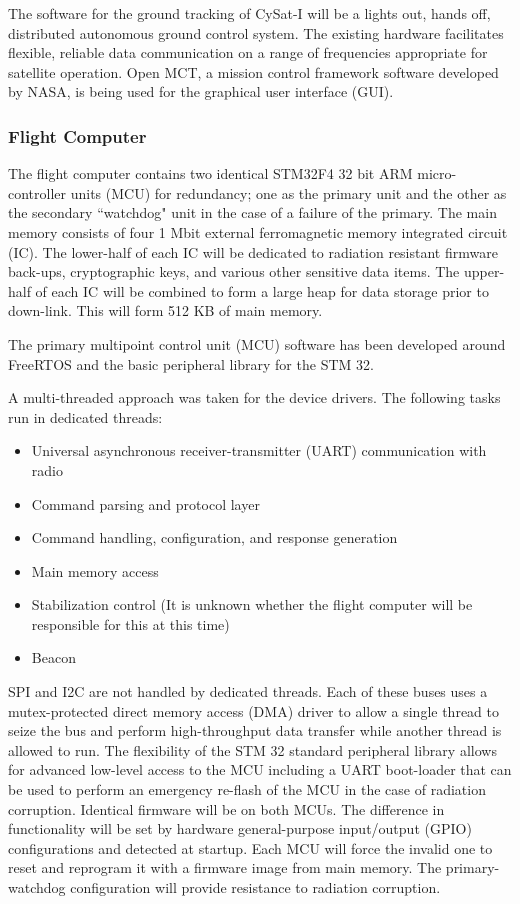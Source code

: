 \documentclass[12pt]{article}
\begin{document}
The software for the ground tracking of CySat-I will be a lights out, hands off, distributed autonomous ground control system. The existing hardware facilitates flexible, reliable data communication on a range of frequencies appropriate for satellite operation. Open MCT, a mission control framework software developed by NASA, is being used for the graphical user interface (GUI).

\subsubsection{Flight Computer}

The flight computer contains two identical STM32F4 32 bit ARM micro-controller units (MCU) for redundancy; one as the primary unit and the other as the secondary ``watchdog" unit in the case of a failure of the primary. The main memory consists of four 1 Mbit external ferromagnetic memory integrated circuit (IC). The lower-half of each IC will be dedicated to radiation resistant firmware back-ups, cryptographic keys, and various other sensitive data items. The upper-half of each IC will be combined to form a large heap for data storage prior to down-link. This will form 512 KB of main memory.

The primary multipoint control unit (MCU) software has been developed around FreeRTOS and the basic peripheral library for the STM 32.

A multi-threaded approach was taken for the device drivers. The following tasks run in dedicated threads:

\begin{itemize}
\item Universal asynchronous receiver-transmitter (UART) communication with radio
\item Command parsing and protocol layer
\item Command handling, configuration, and response generation
\item Main memory access
\item Stabilization control (It is unknown whether the flight computer will be responsible for this at this time)
\item Beacon
\end{itemize}

SPI and I2C are not handled by dedicated threads. Each of these buses uses a mutex-protected direct memory access (DMA) driver to allow a single thread to seize the bus and perform high-throughput data transfer while another thread is allowed to run. The flexibility of the STM 32 standard peripheral library allows for advanced low-level access to the MCU including a UART boot-loader that can be used to perform an emergency re-flash of the MCU in the case of radiation corruption. Identical firmware will be on both MCUs. The difference in functionality will be set by hardware general-purpose input/output (GPIO) configurations and detected at startup. Each MCU will force the invalid one to reset and reprogram it with a firmware image from main memory. The primary-watchdog configuration will provide resistance to radiation corruption.
\end{document}

